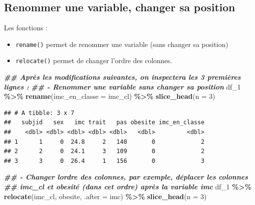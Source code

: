 \documentclass[
]{book}
\newenvironment{Shaded}{\begin{snugshade}}{\end{snugshade}}
\newcommand{\AttributeTok}[1]{\textcolor[rgb]{0.13,0.29,0.53}{#1}}
\newcommand{\DecValTok}[1]{\textcolor[rgb]{0.00,0.00,0.81}{#1}}
\newcommand{\DocumentationTok}[1]{\textcolor[rgb]{0.56,0.35,0.01}{\textbf{\textit{#1}}}}
\newcommand{\FunctionTok}[1]{\textcolor[rgb]{0.13,0.29,0.53}{\textbf{#1}}}
\newcommand{\NormalTok}[1]{#1}
\newcommand{\SpecialCharTok}[1]{\textcolor[rgb]{0.81,0.36,0.00}{\textbf{#1}}}
\providecommand{\tightlist}{%
  \setlength{\itemsep}{0pt}\setlength{\parskip}{0pt}}
\begin{document}
\subsection{Renommer une variable, changer sa position}\label{renommer-une-variable-changer-sa-position}

Les fonctions :

\begin{itemize}
\tightlist
\item
  \texttt{rename()} permet de renommer une variable (sans changer sa position)
\item
  \texttt{relocate()} permet de changer l'ordre des colonnes.
\end{itemize}

\begin{Shaded}
\begin{Highlighting}[]
\DocumentationTok{\#\# Après les modifications suivantes, on inspectera les 3 premières lignes : }
\DocumentationTok{\#\#   {-} Renommer une variable sans changer sa position}
\NormalTok{df\_1 }\SpecialCharTok{\%\textgreater{}\%} 
  \FunctionTok{rename}\NormalTok{(}\AttributeTok{imc\_en\_classe =}\NormalTok{ imc\_cl) }\SpecialCharTok{\%\textgreater{}\%} 
  \FunctionTok{slice\_head}\NormalTok{(}\AttributeTok{n =} \DecValTok{3}\NormalTok{)}
\end{Highlighting}
\end{Shaded}

\begin{verbatim}
## # A tibble: 3 x 7
##   subjid   sex   imc trait   pas obesite imc_en_classe
##    <dbl> <dbl> <dbl> <dbl> <dbl>   <dbl>         <dbl>
## 1      1     0  24.8     2   140       0             2
## 2      2     0  24.1     3   109       0             2
## 3      3     0  26.4     1   156       0             3
\end{verbatim}

\begin{Shaded}
\begin{Highlighting}[]
\DocumentationTok{\#\#   {-} Changer l\textquotesingle{}ordre des colonnes, par exemple, déplacer les colonnes }
\DocumentationTok{\#\#     imc\_cl et obesité (dans cet ordre) après la variable imc}
\NormalTok{df\_1 }\SpecialCharTok{\%\textgreater{}\%} 
  \FunctionTok{relocate}\NormalTok{(imc\_cl, obesite, }\AttributeTok{.after =}\NormalTok{ imc) }\SpecialCharTok{\%\textgreater{}\%} 
  \FunctionTok{slice\_head}\NormalTok{(}\AttributeTok{n =} \DecValTok{3}\NormalTok{)}
\end{Highlighting}
\end{Shaded}
\end{document}

